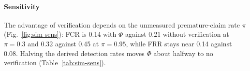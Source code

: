 

\paragraph{Sensitivity} The advantage of verification depends on the unmeasured premature-claim rate $\pi$ (Fig.~\ref{fig:sim-sens}): FCR is 0.14 with $\Phi$ against 0.21 without verification at $\pi=0.3$ and 0.32 against 0.45 at $\pi=0.95$, while FRR stays near 0.14 against 0.08. Halving the derived detection rates moves $\Phi$ about halfway to no verification (Table~\ref{tab:sim-sens}).
